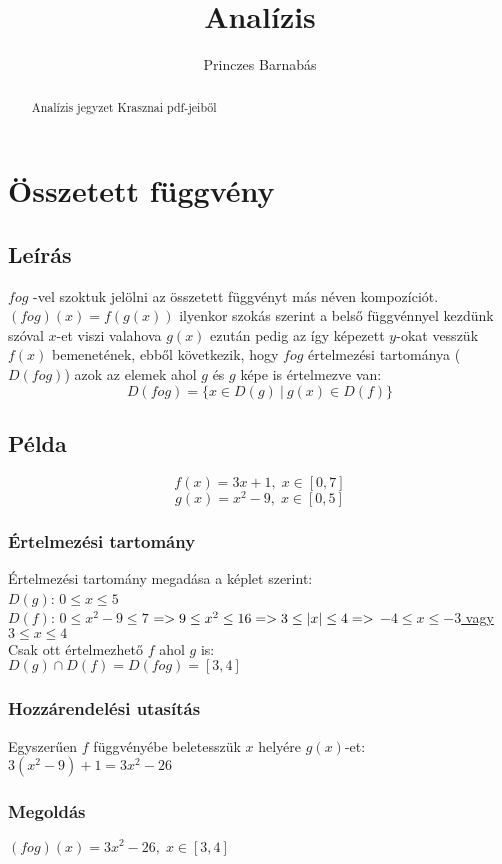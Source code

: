 \documentclass{article}
\title{Analízis}
\author{Princzes
Barnabás}
\theoremstyle{mytheoremstyle}
\theoremstyle{mytheoremstyle}
\theoremstyle{myproblemstyle}
\begin{document}
\maketitle
\begin{abstract}
    Analízis jegyzet Krasznai pdf-jeiből
\end{abstract}
\section{Összetett függvény}
\subsection{Leírás}
$fog$ -vel szoktuk jelölni az összetett függvényt más néven kompozíciót.\\
$(fog)(x) = f(g(x))$ ilyenkor szokás szerint a belső függvénnyel 
kezdünk szóval $x$-et viszi valahova $g(x)$ ezután pedig az így képezett $y$-okat vesszük 
$f(x)$ bemenetének, ebből következik, hogy $fog$ értelmezési tartománya ($D(fog)$)
azok az elemek ahol $g$ és $g$ képe is értelmezve van:
$$D(fog)=\{x\in D(g)\:|\:g(x)\in D(f)\}$$
\subsection{Példa}
$$f(x)=3x+1,\;x\in [0,7]$$
$$g(x)=x^2-9,\;x\in [0,5]$$
\subsubsection{Értelmezési tartomány}
Értelmezési tartomány megadása a képlet szerint:\\
$D(g)$: $0\leq x\leq 5$\\
$D(f)$: \underline{$0\leq x^2-9\leq 7$}
$ => 9\leq x^2\leq 16 => 3\leq \abs{x}\leq 4 => $
\underline{$-4\leq x\leq -3$ vagy $3\leq x\leq 4$}\\
Csak ott értelmezhető $f$ ahol $g$ is:\\
$D(g) \cap D(f) = D(fog) = [3,4]$\\
\subsubsection{Hozzárendelési utasítás}
Egyszerűen $f$ függvényébe beletesszük $x$ helyére $g(x)$-et:\\
$3(x^2-9)+1 = 3x^2-26$
\subsubsection{Megoldás}
$(fog)(x) = 3x^2-26,\;x\in [3,4]$
\end{document}
